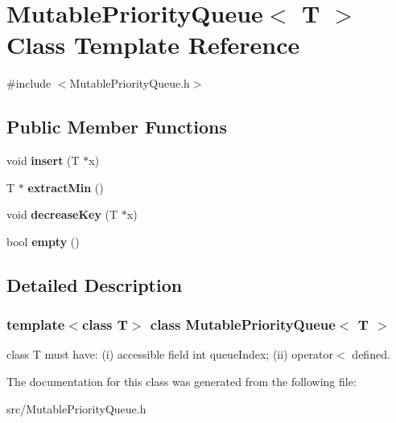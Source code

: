 \hypertarget{class_mutable_priority_queue}{}\section{Mutable\+Priority\+Queue$<$ T $>$ Class Template Reference}
\label{class_mutable_priority_queue}


{\ttfamily \#include $<$Mutable\+Priority\+Queue.\+h$>$}

\subsection*{Public Member Functions}
\begin{DoxyCompactItemize}
\item 
\mbox{\label{class_mutable_priority_queue_a058fc182052af82e10cc3719e448b62d}} 
void {\bfseries insert} (T $\ast$x)
\item 
\mbox{\label{class_mutable_priority_queue_a3880874d7364279ac0d6d31302b28853}} 
T $\ast$ {\bfseries extract\+Min} ()
\item 
\mbox{\label{class_mutable_priority_queue_a0878839cc1d2dba2b8ab2e589ecc6405}} 
void {\bfseries decrease\+Key} (T $\ast$x)
\item 
\mbox{\label{class_mutable_priority_queue_a2edbb1f4a6fa3ff735700dfcebebe8d4}} 
bool {\bfseries empty} ()
\end{DoxyCompactItemize}


\subsection{Detailed Description}
\subsubsection*{template$<$class T$>$\newline
class Mutable\+Priority\+Queue$<$ T $>$}

class T must have\+: (i) accessible field int queue\+Index; (ii) operator$<$ defined. 

The documentation for this class was generated from the following file\+:\begin{DoxyCompactItemize}
\item 
src/Mutable\+Priority\+Queue.\+h\end{DoxyCompactItemize}
